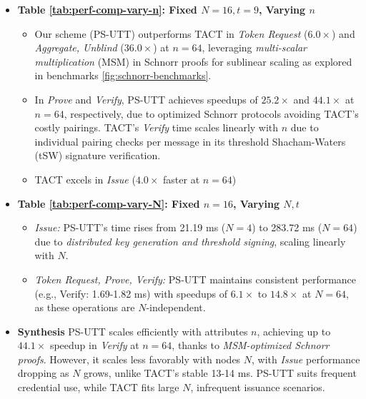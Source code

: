\begin{itemize}
    \item \textbf{Table \ref{tab:perf-comp-vary-n}: Fixed $N = 16, t = 9$, Varying $n$}
        \begin{itemize}
        \item Our scheme (PS-UTT) outperforms TACT in \textit{Token Request} ($6.0\times$) and \textit{Aggregate, Unblind} ($36.0\times$) at $n = 64$, leveraging \textit{multi-scalar multiplication} (MSM) in Schnorr proofs for sublinear scaling as explored in benchmarks \ref{fig:schnorr-benchmarks}. 
        
        \item In \textit{Prove} and \textit{Verify}, PS-UTT achieves speedups of $25.2\times$ and $44.1\times$ at $n = 64$, respectively, due to optimized Schnorr protocols avoiding TACT's costly pairings. TACT's \textit{Verify} time scales linearly with $n$ due to individual pairing checks per message in its threshold Shacham-Waters (tSW) signature verification.
        
        \item TACT excels in \textit{Issue} ($4.0\times$ faster at $n = 64$)
    \end{itemize}

    \item  \textbf{Table \ref{tab:perf-comp-vary-N}: Fixed $n = 16$, Varying $N,t$}
        \begin{itemize}
            \item \textit{Issue:} PS-UTT's time rises from 21.19 ms ($N = 4$) to 283.72 ms ($N = 64$) due to \textit{distributed key generation and threshold signing}, scaling linearly with $N$. 
            \item \textit{Token Request, Prove, Verify:} PS-UTT maintains consistent performance (e.g., Verify: 1.69-1.82 ms) with speedups of $6.1\times$ to $14.8\times$ at $N = 64$, as these operations are $N$-independent.
        \end{itemize}

    \item \textbf{Synthesis}
    PS-UTT scales efficiently with attributes $n$, achieving up to $44.1\times$ speedup in \textit{Verify} at $n = 64$, thanks to \textit{MSM-optimized Schnorr proofs}. However, it scales less favorably with nodes $N$, with \textit{Issue} performance dropping as $N$ grows, unlike TACT’s stable 13-14 ms. PS-UTT suits frequent credential use, while TACT fits large $N$, infrequent issuance scenarios.

\end{itemize}












